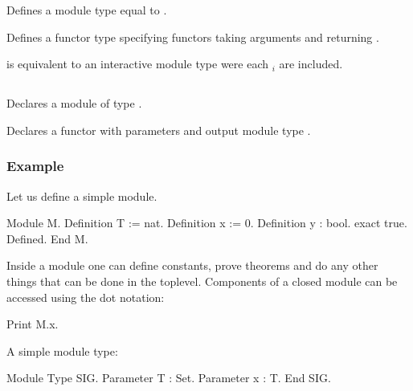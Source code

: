 Defines a module type {\ident} equal to {\modtype}.

\begin{Variants}
\item {}

  Defines a functor type {\ident} specifying functors taking arguments
  {\modbindings} and returning {\modtype}.

\item{}

  is equivalent to an interactive module type were each {\modtype$_i$} are included.

\end{Variants}

\subsection{}

Declares a module {\ident} of type {\modtype}.

\begin{Variants}

\item{}

  Declares a functor with parameters {\modbindings} and output module
  type {\modtype}.


\end{Variants}


\subsubsection{Example}

Let us define a simple module.
\begin{coq_example}
Module M.
  Definition T := nat.
  Definition x := 0.
  Definition y : bool.
    exact true.
  Defined.
End M.
\end{coq_example}
Inside a module one can define constants, prove theorems and do any
other things that can be done in the toplevel. Components of a closed
module can be accessed using the dot notation:
\begin{coq_example}
Print M.x.
\end{coq_example}
A simple module type:
\begin{coq_example}
Module Type SIG.
  Parameter T : Set.
  Parameter x : T.
End SIG.
\end{coq_example}

